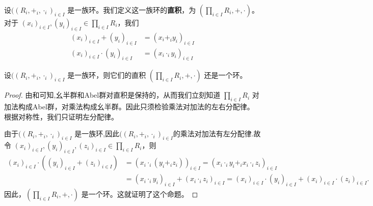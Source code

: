\documentclass[../../main.tex]{subfiles}
\begin{document}
\begin{definition}[环的直积]
设$((R_i, +_i, \cdot_i)_{i \in I}$ 是一族环。我们定义这一族环的\textbf{直积}，为 $(\prod_{i \in I} R_i, +, \cdot)$。对于 $(x_i)_{i \in I}, (y_i)_{i \in I} \in \prod_{i \in I} R_i$，我们
\begin{align}
(x_i)_{i \in I} + (y_i)_{i \in I} &= (x_i +_i y_i)_{i \in I} \label{eq:2.23}\\
(x_i)_{i \in I} \cdot (y_i)_{i \in I} &= (x_i \cdot_i y_i)_{i \in I} \label{eq:2.24}
\end{align}
\end{definition}

\begin{proposition}[环的直积仍是环]\label{proposition:环的直积仍是环}
设$((R_i, +_i, \cdot_i)_{i \in I}$ 是一族环，则它们的直积 $(\prod_{i \in I} R_i, +, \cdot)$ 还是一个环。
\end{proposition}
\begin{proof}
由和可知,幺半群和Abel群对直积是保持的，从而我们立刻知道 $\prod_{i \in I} R_i$ 对加法构成Abel群，对乘法构成幺半群。因此只须检验乘法对加法的左右分配律。根据对称性，我们只证明左分配律。

由于$((R_i, +_i, \cdot_i)_{i \in I}$ 是一族环,因此$((R_i, +_i, \cdot_i)_{i \in I}$的乘法对加法有左分配律.故令 $(x_i)_{i \in I}, (y_i)_{i \in I}, (z_i)_{i \in I} \in \prod_{i \in I} R_i$，则
\begin{align*}
(x_i)_{i\in I}\cdot ((y_i)_{i\in I}+(z_i)_{i\in I})&=(x_i\cdot _i(y_i+_iz_i))_{i\in I}=(x_i\cdot _iy_i+_ix_i\cdot _iz_i)_{i\in I}\\
&=(x_i\cdot _iy_i)_{i\in I}+(x_i\cdot _iz_i)_{i\in I}=(x_i)_{i\in I}\cdot (y_i)_{i\in I}+(x_i)_{i\in I}\cdot (z_i)_{i\in I}.
\end{align*}
因此，$(\prod_{i \in I} R_i, +, \cdot)$ 是一个环。这就证明了这个命题。 
\end{proof}
\end{document}
